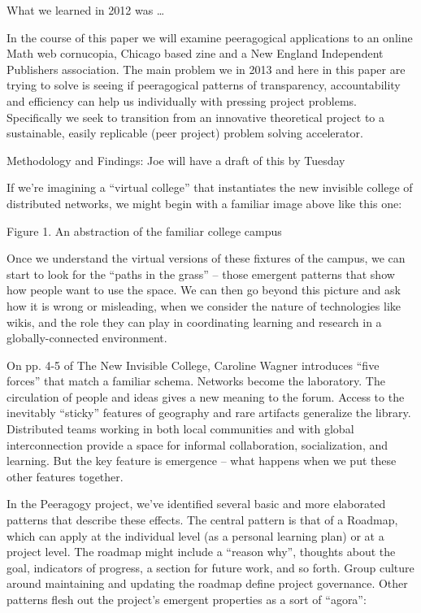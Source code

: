 \documentclass{acm_proc_article-sp}
\begin{document}
What we learned in 2012 was \ldots

In the course of this paper we will examine peeragogical applications to an online Math web cornucopia, Chicago based zine and a New England Independent Publishers association. The main problem we in 2013 and here in this paper are trying to solve is seeing if peeragogical patterns of transparency, accountability and efficiency can help us individually with pressing project problems. Specifically we seek to transition from an innovative theoretical project to a sustainable, easily replicable (peer project) problem solving accelerator.

Methodology and Findings: Joe will have a draft of this by Tuesday

If we're imagining a ``virtual college'' that instantiates the new invisible college of distributed networks, we might begin with a familiar image above like this one:

Figure 1. An abstraction of the familiar college campus

Once we understand the virtual versions of these fixtures of the campus, we can start to look for the ``paths in the grass'' -- those emergent patterns that show how people want to use the space. We can then go beyond this picture and ask how it is wrong or misleading, when we consider the nature of technologies like wikis, and the role they can play in coordinating learning and research in a globally-connected environment.

On pp. 4-5 of The New Invisible College, Caroline Wagner introduces ``five forces'' that match a familiar schema. Networks become the laboratory. The circulation of people and ideas gives a new meaning to the forum. Access to the inevitably ``sticky'' features of geography and rare artifacts generalize the library. Distributed teams working in both local communities and with global interconnection provide a space for informal collaboration, socialization, and learning. But the key feature is emergence -- what happens when we put these other features together.

In the Peeragogy project, we've identified several basic and more elaborated patterns that describe these effects. The central pattern is that of a Roadmap, which can apply at the individual level (as a personal learning plan) or at a project level. The roadmap might include a ``reason why'', thoughts about the goal, indicators of progress, a section for future work, and so forth. Group culture around maintaining and updating the roadmap define project governance. Other patterns flesh out the project's emergent properties as a sort of ``agora'':
\end{document}
